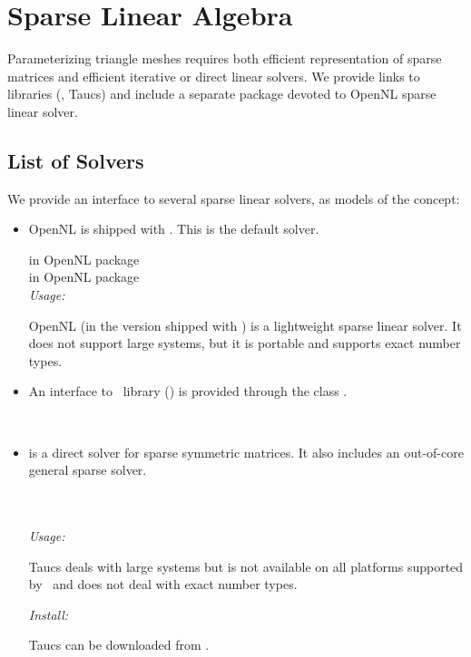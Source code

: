 \section{Sparse Linear Algebra \label{sec:Sparse-Linear-Algebra}}

Parameterizing triangle meshes requires both efficient representation
of sparse matrices and efficient iterative or direct linear
solvers. We provide links to libraries (\eigen, {\sc Taucs})
and include a separate package devoted to OpenNL sparse linear solver.

\subsection{List of Solvers}

We provide an interface to several sparse linear solvers, as models
of the  concept:

\begin{itemize}

\item
    OpenNL \cite{cgal:l-nmdgp-05} is shipped with \cgal. This is the default solver.

     in OpenNL package  \\
     in OpenNL package  \\

    \emph{Usage:}

    OpenNL (in the version shipped with \cgal) is a lightweight sparse linear solver.
    It does not support large systems, but it is portable and
    supports exact number types.

\item
    An interface to \eigen\ library (\eigenpage) is provided through the class
    .
    
    \\


\item
    is a direct solver for sparse symmetric matrices.
    It also includes an out-of-core general sparse solver.

      \\
      \\

    \emph{Usage:}

    {\sc Taucs} deals with large systems
    but is not available on all platforms
    supported by \cgal\ and does not deal with exact number types.

    \emph{Install:}

    {\sc Taucs} can be downloaded from
    {}.

\end{itemize}


